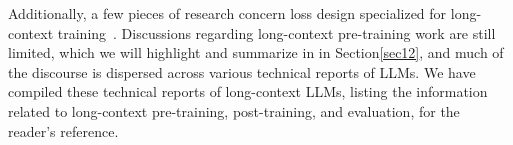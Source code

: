 Additionally, a few pieces of research concern loss design specialized for long-context training~\citep{fang2024wrong}. Discussions regarding long-context pre-training work are still limited, which we will highlight and summarize in \textbf{} in Section\ref{sec12}, and much of the discourse is dispersed across various technical reports of LLMs. We have compiled these technical reports of long-context LLMs, listing the information related to long-context pre-training, post-training, and evaluation, for the reader's reference.


